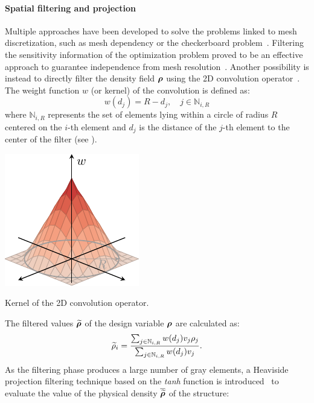 \paragraph{Spatial filtering and projection} 
Multiple approaches have been developed to solve the problems linked to mesh discretization, such as mesh dependency or the checkerboard problem~. Filtering the sensitivity information of the optimization problem proved to be an effective approach to guarantee independence from mesh resolution~. Another possibility is instead to directly filter the density field $\bm{\rho}$ using the 2D convolution operator~. The weight function $w$ (or kernel) of the convolution is defined as:
\begin{equation}
    w(d_j) = R - d_j, \quad j \in \mathbb{N}_{i,R}
\end{equation} 
where $\mathbb{N}_{i,R}$ represents the set of elements lying within a circle of radius $R$ centered on the $i$-th element and $d_j$ is the distance of the $j$-th element to the center of the filter (see ).
\begin{marginfigure}
    \centering
    \includegraphics{figures/02_literature/02_circ_filter/filt_cir.pdf}
    \caption{Kernel of the 2D convolution operator.}
    \label{fig:02_ker}
\end{marginfigure} 
The filtered values $\bm{\widetilde{\rho}}$ of the design variable $\bm{\rho}$  are calculated as:
\begin{equation}
    \widetilde{\rho}_i = \frac{\sum_{j \in \mathbb{N}_{i,R}} w(d_j)v_j\rho_j}{\sum_{j \in \mathbb{N}_{i,R}} w(d_j)v_j}.
    \label{eq:02_rhofil}
\end{equation}
As the filtering phase produces a large number of gray elements, a Heaviside projection filtering technique based on the \textit{tanh} function is introduced~ to evaluate the value of the physical density $\bm{\overline{\widetilde{\rho}}}$ of the structure:
